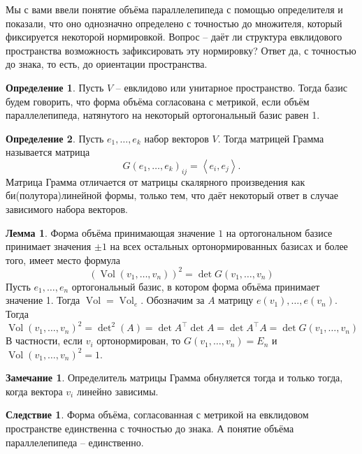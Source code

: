 \documentclass[10pt,a4paper,oneside]{book} %
\theoremstyle{definition}
\newtheorem*{rem}{Замечание}
\newtheorem{zad}{Задача}
\newtheorem*{defn}{Определение}
\newtheorem{lem}{Лемма}
\newtheorem{cor}{Следствие}
\newcommand{\Vol}{\operatorname{Vol}}
\def\lan{\left\langle }
\def\ran{\right\rangle}
\def\dfn{\begin{defn}}
\def\edfn{\end{defn}}
\def\lm{\begin{lem}}
\def\elm{\end{lem}}
\def\zd{\begin{zad}}
\def\ezd{\end{zad}}
\def\crl{\begin{cor}}
\def\ecrl{\end{cor}}
\def\rm{\begin{rem}}
\def\erm{\end{rem}}
\begin{document}
Мы с вами ввели понятие объёма параллелепипеда с помощью определителя и показали, что оно однозначно определено с точностью до множителя, который фиксируется некоторой нормировкой. Вопрос -- даёт ли структура евклидового пространства возможность зафиксировать эту нормировку? Ответ да, с точностью до знака, то есть, до ориентации пространства.

\dfn Пусть $V$ -- евклидово или унитарное пространство. Тогда базис будем говорить, что форма объёма согласована с метрикой, если объём параллелепипеда, натянутого на некоторый ортогональный базис равен 1.
\edfn

\dfn Пусть $e_1,\dots, e_k$ набор векторов $V$. Тогда матрицей Грамма называется матрица 
$$G(e_1,\dots,e_k)_{ij}= \lan e_i, e_j\ran.$$
Матрица Грамма отличается от матрицы скалярного произведения как би(полутора)линейной формы, только тем, что даёт некоторый ответ в случае зависимого набора векторов. 
\edfn

\lm
Форма объёма принимающая значение $1$ на ортогональном базисе принимает значения $\pm 1$ на всех остальных ортонормированных базисах и более того, имеет место формула
$$(\Vol(v_1,\dots,v_n))^2= \det G(v_1,\dots,v_n)$$
\proof Пусть $e_1,\dots,e_n$ ортогональный базис, в котором форма объёма принимает значение 1. Тогда $\Vol= \Vol_e$. Обозначим за $A$ матрицу $e(v_1),\dots,e(v_n)$. Тогда $$\Vol(v_1,\dots,v_n)^2= \det\nolimits^2 (A)= \det A^{\top} \det A= \det A^{\top}A= \det G(v_1,\dots,v_n)$$
В частности, если $v_i$ ортонормирован, то $G(v_1,\dots,v_n)=E_n$ и $\Vol(v_1,\dots,v_n)^2=1$.
\endproof
\elm

\rm Определитель матрицы Грамма обнуляется тогда и только тогда, когда вектора $v_i$ линейно зависимы.
\erm

\crl Форма объёма, согласованная с метрикой на евклидовом пространстве единственна с точностью до знака. А понятие объёма параллелепипеда -- единственно.
\ecrl


\begin{comment}

Так же можно дать явную формулу для расстояния через определители.
\lm Пусть подпространство $U$ имеет базис $e_1,\dots,e_k$. Тогда $\rho(x_0, U)^2 = \frac{\det G(e_1,\dots,e_k,x_0)}{\det G(e_1,\dots,e_k)}$ 
\elm 



\dfn $V$ --- евклидово пространство $U$ -- его подпространство, а $x_0$ вектор из $V$. Определим косинус угла $\angle x_0,U$ как 
$$\cos \angle x_0,U=\sup_{0\neq y\in U} \cos \angle x_0,y =\sup_{0\neq y\in U} \frac{|\lan x_0,y\ran| }{\|x_0\|\|y\|}.$$  
То есть мы ищем минимальный угол из отрезка $[0,\frac{\pi}{2}]$. Заметим, что в евклидовом случае отрицательные косинусы не имеют смысла, так как всегда можно домножить $y$ на $-1$.
\edfn

\lm Наименьший угол достигается между $x_0$ и его проекцией на $U$ и его косинус равен $\frac{\|pr_{U}x_0\|}{\|x_0\|}$.  
\elm


\zd Докажите аналогичное свойство в унитарном случае.
\ezd


\end{comment}
\end{document}
